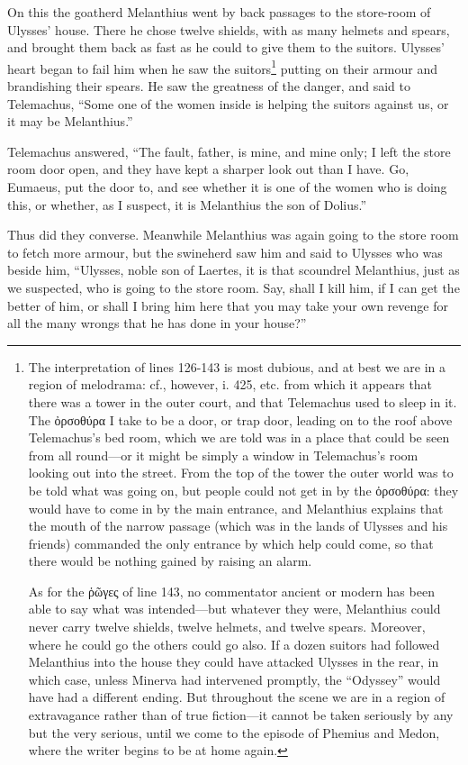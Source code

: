 On this the goatherd Melanthius went by back passages to the store-room of
Ulysses’ house. There he chose twelve shields, with as many helmets and spears,
and brought them back as fast as he could to give them to the suitors. Ulysses’
heart began to fail him when he saw the suitors\footnote{The interpretation of lines 126-143 is most dubious, and at best we are in a
region of melodrama: cf., however, i. 425, etc. from which it appears that
there was a tower in the outer court, and that Telemachus used to sleep in it.
The ὀρσοθύρα I take to be a door, or
trap door, leading on to the roof above Telemachus’s bed room, which we are
told was in a place that could be seen from all round—or it might be simply a
window in Telemachus’s room looking out into the street. From the top of the
tower the outer world was to be told what was going on, but people could not
get in by the ὀρσοθύρα: they would
have to come in by the main entrance, and Melanthius explains that the mouth
of the narrow passage (which was in the lands of Ulysses and his friends)
commanded the only entrance by which help could come, so that there would be
nothing gained by raising an alarm.

As for the ῥῶγες of line 143, no commentator
ancient or modern has been able to say what was intended—but whatever they
were, Melanthius could never carry twelve shields, twelve helmets, and twelve
spears. Moreover, where he could go the others could go also. If a dozen
suitors had followed Melanthius into the house they could have attacked Ulysses
in the rear, in which case, unless Minerva had intervened promptly, the
“Odyssey” would have had a different ending. But throughout the scene we are in
a region of extravagance rather than of true fiction—it cannot be taken
seriously by any but the very serious, until we come to the episode of Phemius
and Medon, where the writer begins to be at home again.} putting on their armour and
brandishing their spears. He saw the greatness of the danger, and said to
Telemachus, “Some one of the women inside is helping the suitors against us, or
it may be Melanthius.”

Telemachus answered, “The fault, father, is mine, and mine only; I left the
store room door open, and they have kept a sharper look out than I have. Go,
Eumaeus, put the door to, and see whether it is one of the women who is doing
this, or whether, as I suspect, it is Melanthius the son of Dolius.”

Thus did they converse. Meanwhile Melanthius was again going to the store room
to fetch more armour, but the swineherd saw him and said to Ulysses who was
beside him, “Ulysses, noble son of Laertes, it is that scoundrel Melanthius,
just as we suspected, who is going to the store room. Say, shall I kill him, if
I can get the better of him, or shall I bring him here that you may take your
own revenge for all the many wrongs that he has done in your house?”

